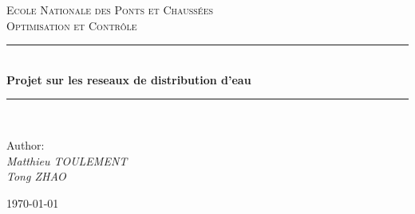 \begin{titlepage}

\newcommand{\HRule}{\rule{\linewidth}{0.5mm}} %

\center %
 

\textsc{\LARGE Ecole Nationale des Ponts et Chaussées}\\[1.5cm] %
\textsc{\Large Optimisation et Contrôle}\\[0.5cm] %



\HRule \\[0.4cm]
{ \huge \bfseries Projet sur les reseaux de distribution d'eau}\\[0.4cm] %
\HRule \\[1.5cm]
 

\begin{center}

Author: \emph{\\ \vspace{0.8em} Matthieu TOULEMENT \\ Tong ZHAO}

\end{center}




{\large \today}\\[2cm] %


\end{titlepage}
